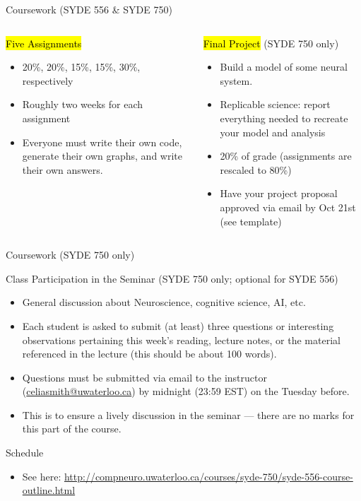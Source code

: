 \documentclass[aspectratio=169]{beamer}
\begin{document}
\begin{frame}{Coursework (SYDE 556 \& SYDE 750)}
	\begin{columns}[t]
		\begin{block}{\hl{Five Assignments}}
		\begin{itemize}
				\item 20\%, 20\%, 15\%, 15\%, 30\%, respectively
				\item Roughly two weeks for each assignment
				\item Everyone must write their own code, generate their own graphs, and write their own answers.
			\end{itemize}
		\end{block}
		\begin{block}{\hl{Final Project} (SYDE 750 only)}
			\begin{itemize}
				\item Build a model of some neural system.
				\item Replicable science: report everything needed to recreate your model and analysis
				\item 20\% of grade (assignments are rescaled to 80\%)
				\item Have your project proposal approved via email by Oct 21st (see template)
			\end{itemize}
		\end{block}
	\end{columns}
\end{frame}

\begin{frame}{Coursework (SYDE 750 only)}
	\begin{block}{Class Participation in the Seminar  (SYDE 750 only; optional for SYDE 556)}
	\begin{itemize}
		\item General discussion about Neuroscience, cognitive science, AI, etc.
		\item Each student is asked to submit (at least) three questions or interesting observations pertaining this week's reading, lecture notes, or the material referenced in the lecture (this should be about 100 words).
		\item Questions must be submitted via email to the instructor (\url{celiasmith@uwaterloo.ca}) by midnight (23:59 EST) on the Tuesday before.
    \item This is to ensure a lively discussion in the seminar --- there are no marks for this part of the course.
  \end{itemize}
	\end{block}
\end{frame}

\begin{frame}{Schedule}
    \begin{itemize}
      \item See here: \url{http://compneuro.uwaterloo.ca/courses/syde-750/syde-556-course-outline.html}
    \end{itemize}
\end{frame}
\end{document}
